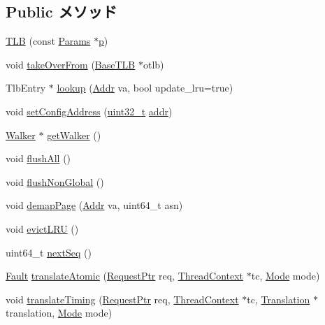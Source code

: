 \subsection*{Public メソッド}
\begin{DoxyCompactItemize}
\item 
\hyperlink{classX86ISA_1_1TLB_acb886bd3c59f00c21be9ceaaf25dab97}{TLB} (const \hyperlink{classX86ISA_1_1TLB_a9122b46075a6970493519b96564e6356}{Params} $\ast$\hyperlink{namespaceX86ISA_af675c1d542a25b96e11164b80809a856}{p})
\item 
void \hyperlink{classX86ISA_1_1TLB_a15b6c15c1be2ca4de3e65772a02aa29f}{takeOverFrom} (\hyperlink{classBaseTLB}{BaseTLB} $\ast$otlb)
\item 
TlbEntry $\ast$ \hyperlink{classX86ISA_1_1TLB_ab71ae01bf6743de678ebdc212e7bb401}{lookup} (\hyperlink{base_2types_8hh_af1bb03d6a4ee096394a6749f0a169232}{Addr} va, bool update\_\-lru=true)
\item 
void \hyperlink{classX86ISA_1_1TLB_ae9a8e1a2483b506a07feeeea766ba43e}{setConfigAddress} (\hyperlink{Type_8hh_a435d1572bf3f880d55459d9805097f62}{uint32\_\-t} \hyperlink{namespaceX86ISA_ab705917f60c5566f9ce56a93f798b2e2}{addr})
\item 
\hyperlink{classX86ISA_1_1Walker}{Walker} $\ast$ \hyperlink{classX86ISA_1_1TLB_a2f35a7f4b93d6ec096a0785e0d7113cd}{getWalker} ()
\item 
void \hyperlink{classX86ISA_1_1TLB_aca1483a67aee5a91e442f7131d66bcbd}{flushAll} ()
\item 
void \hyperlink{classX86ISA_1_1TLB_a31bf0dd34724a05bf42926ee68e516ef}{flushNonGlobal} ()
\item 
void \hyperlink{classX86ISA_1_1TLB_a18477caae4a9699b99ee4f1ebca75c31}{demapPage} (\hyperlink{base_2types_8hh_af1bb03d6a4ee096394a6749f0a169232}{Addr} va, uint64\_\-t asn)
\item 
void \hyperlink{classX86ISA_1_1TLB_ae59fbc0829276a4cd557c908baf052f0}{evictLRU} ()
\item 
uint64\_\-t \hyperlink{classX86ISA_1_1TLB_ab150a470cb370c561702b113ede76c7d}{nextSeq} ()
\item 
\hyperlink{classRefCountingPtr}{Fault} \hyperlink{classX86ISA_1_1TLB_ad54e01e3c0a1613098a76b7f92e5be93}{translateAtomic} (\hyperlink{classRequest}{RequestPtr} req, \hyperlink{classThreadContext}{ThreadContext} $\ast$tc, \hyperlink{classBaseTLB_a46c8a310cf4c094f8c80e1cb8dc1f911}{Mode} mode)
\item 
void \hyperlink{classX86ISA_1_1TLB_ae52f7e465748883695d2b4f432a13652}{translateTiming} (\hyperlink{classRequest}{RequestPtr} req, \hyperlink{classThreadContext}{ThreadContext} $\ast$tc, \hyperlink{classBaseTLB_1_1Translation}{Translation} $\ast$translation, \hyperlink{classBaseTLB_a46c8a310cf4c094f8c80e1cb8dc1f911}{Mode} mode)

\end{DoxyCompactItemize}
